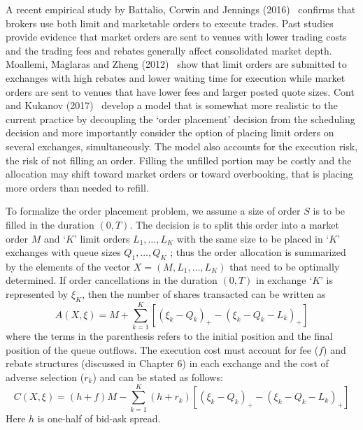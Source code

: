 A recent empirical study by Battalio, Corwin and Jennings (2016)~\cite{} confirms that brokers use both limit and marketable orders to execute trades. Past studies provide evidence that market orders are sent to venues with lower trading costs and the trading fees and rebates generally affect consolidated market depth. Moallemi, Maglaras and Zheng (2012)~\cite{} show that limit orders are submitted to exchanges with high rebates and lower waiting time for execution while market orders are sent to venues that have lower fees and larger posted quote sizes. Cont and Kukanov (2017)~\cite{contk} develop a model that is somewhat more realistic to the current practice by decoupling the `order placement' decision from the scheduling decision and more importantly consider the option of placing limit orders on several exchanges, simultaneously. The model also accounts for the execution risk, the risk of not filling an order. Filling the unfilled portion may be costly and the allocation may shift toward market orders or toward overbooking, that is placing more orders than needed to refill.


To formalize the order placement problem, we assume a size of order $S$ is to be filled in the duration $(0,T)$. The decision is to split this order into a market order $M$ and `$K$' limit orders $L_1,\ldots,L_K$ with the same size to be placed in `$K$' exchanges with queue sizes $Q_1,\ldots,Q_K$ ; thus the order allocation is summarized by the elements of the vector $X=(M,L_1,\ldots,L_K)$ that need to be optimally determined. If order cancellations in the duration $(0,T)$ in exchange `$K$' is represented by $\xi_K$, then the number of shares transacted can be written as 
	\begin{equation}\label{eqn:axe}
	A(X,\xi)= M + \sum_{k=1}^K \left[ (\xi_k - Q_k)_+ - (\xi_k - Q_k - L_k)_+ \right]
	\end{equation}
where the terms in the parenthesis refers to the initial position and the final position of the queue outflows. The execution cost must account for fee ($f$) and rebate structures (discussed in Chapter 6) in each exchange and the cost of adverse selection ($r_k$) and can be stated as follows:
	\begin{equation}\label{eqn:cxe}
	C(X,\xi)= (h+f)M - \sum_{k=1}^K (h+r_k) \left[ (\xi_k - Q_k)_+ - (\xi_k - Q_k - L_k)_+ \right]
	\end{equation}
Here $h$ is one-half of bid-ask spread. 


